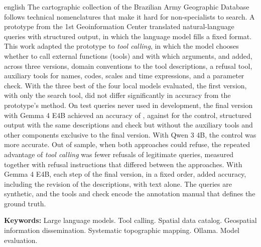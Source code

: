 \begin{resumo}[Abstract]
 \begin{otherlanguage*}{english}
\SingleSpacing
The cartographic collection of the Brazilian Army Geographic Database follows technical nomenclatures that make it hard for non-specialists to search. A prototype from the 1st Geoinformation Center translated natural-language queries with structured output, in which the language model fills a fixed format. This work adapted the prototype to \textit{tool calling}, in which the model chooses whether to call external functions (tools) and with which arguments, and added, across three versions, domain conventions to the tool descriptions, a refusal tool, auxiliary tools for names, codes, scales and time expressions, and a parameter check. With the three best of the four local models evaluated, the first version, with only the search tool, did not differ significantly in accuracy from the prototype's method. On  test queries never used in development, the final version with Gemma 4 E4B achieved an accuracy of , against  for the control, structured output with the same descriptions and check but without the auxiliary tools and other components exclusive to the final version. With Qwen 3 4B, the control was more accurate. Out of sample, when both approaches could refuse, the repeated advantage of \textit{tool calling} was fewer refusals of legitimate queries, measured together with refusal instructions that differed between the approaches. With Gemma 4 E4B, each step of the final version, in a fixed order, added accuracy, including the revision of the descriptions, with text alone. The queries are synthetic, and the tools and check encode the annotation manual that defines the ground truth.

   \vspace{\onelineskip}
   \noindent
   \textbf{Keywords:} Large language models. Tool calling. Spatial data catalog. Geospatial information dissemination. Systematic topographic mapping. Ollama. Model evaluation.
 \end{otherlanguage*}
\end{resumo}

